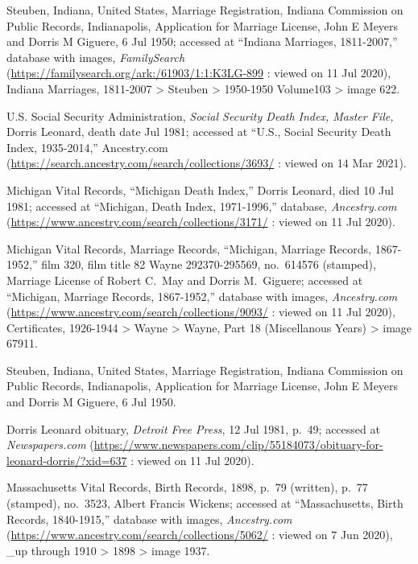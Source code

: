 \begin{thebibliography}{999}
Steuben, Indiana, United States, Marriage Registration, Indiana Commission on Public Records, Indianapolis, Application for Marriage License, John E Meyers and Dorris M Giguere, 6 Jul 1950; accessed at ``Indiana Marriages, 1811-2007,'' database with images, \textit{FamilySearch} (\url{https://familysearch.org/ark:/61903/1:1:K3LG-899} : viewed on 11 Jul 2020), Indiana Marriages, 1811-2007 > Steuben > 1950-1950 Volume103 > image 622.

U.S. Social Security Administration, \textit{Social Security Death Index, Master File,} Dorris Leonard, death date Jul 1981; accessed at ``U.S., Social Security Death Index, 1935-2014,'' Ancestry.com (\url{https://search.ancestry.com/search/collections/3693/} : viewed on 14 Mar 2021).

Michigan Vital Records, ``Michigan Death Index,'' Dorris Leonard, died 10 Jul 1981; accessed at ``Michigan, Death Index, 1971-1996,'' database, \textit{Ancestry.com} (\url{https://www.ancestry.com/search/collections/3171/} : viewed on 11 Jul 2020).

Michigan Vital Records, Marriage Records, ``Michigan, Marriage Records, 1867-1952,'' film 320, film title 82 Wayne 292370-295569, no.\ 614576 (stamped), Marriage License of Robert C.\ May and Dorris M.\ Giguere; accessed at ``Michigan, Marriage Records, 1867-1952,'' database with images, \textit{Ancestry.com} (\url{https://www.ancestry.com/search/collections/9093/} : viewed on 11 Jul 2020), Certificates, 1926-1944 > Wayne > Wayne, Part 18 (Miscellanous Years) > image 67911.

Steuben, Indiana, United States, Marriage Registration, Indiana Commission on Public Records, Indianapolis, Application for Marriage License, John E Meyers and Dorris M Giguere, 6 Jul 1950.

Dorris Leonard obituary, \textit{Detroit Free Press}, 12 Jul 1981, p.\ 49; accessed at \textit{Newspapers.com} (\url{https://www.newspapers.com/clip/55184073/obituary-for-leonard-dorris/?xid=637} : viewed on 11 Jul 2020).


Massachusetts Vital Records, Birth Records, 1898, p.\ 79 (written), p.\ 77 (stamped), no.\ 3523, Albert Francis Wickens; accessed at ``Massachusetts, Birth Records, 1840-1915,'' database with images, \textit{Ancestry.com} (\url{https://www.ancestry.com/search/collections/5062/} : viewed on 7 Jun 2020), \_up through 1910 > 1898 > image 1937.


\end{thebibliography}
